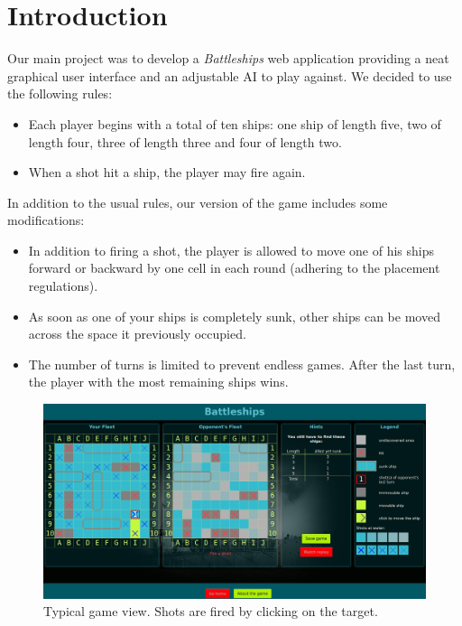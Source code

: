 \documentclass[a4paper]{easychair}
\begin{document}
\section{Introduction}
\label{sect:intro}
Our main project was to develop a \emph{Battleships} web application providing a neat graphical user interface and an adjustable AI to play against.
We decided to use the following rules:
\begin{itemize}
 \item Each player begins with a total of ten ships: one ship of length five, two of length four, three of length three and four of length two.

 \item When a shot hit a ship, the player may fire again.
\end{itemize}

In addition to the usual rules, our version of the game includes some modifications:

\begin{itemize}
 \item 
 In addition to firing a shot, the player is allowed to move one of his ships forward or backward by one cell in each round (adhering to the placement regulations).
 \item
 As soon as one of your ships is completely sunk, other ships can be moved across the space it previously occupied.
 \item
 The number of turns is limited to prevent endless games. After the last turn, the player with the most remaining ships wins.
\end{itemize}

\begin{figure}
 \centering
  \includegraphics[width=\textwidth]{play.png}
 \caption{Typical game view. Shots are fired by clicking on the target.}
\end{figure}
\end{document}
